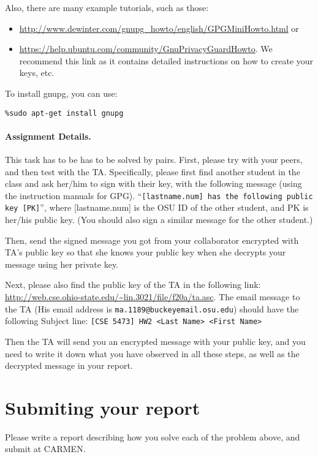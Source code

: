 \documentclass[11pt]{article}
\begin{document}
Also, there are many example tutorials, such as those:
\begin{itemize}
\item \url{http://www.dewinter.com/gnupg_howto/english/GPGMiniHowto.html} or
\item \url{https://help.ubuntu.com/community/GnuPrivacyGuardHowto}. We recommend this link as it contains detailed instructions on how to create your keys, etc.
\end{itemize}

To install gnupg, you can use:
\begin{lstlisting}
%sudo apt-get install gnupg
\end{lstlisting}

\paragraph{Assignment Details.} This task has to be has to be solved by pairs. First, please try with your peers, and then test with the TA. Specifically, please first find another student in the class and ask her/him to sign with their key, with the following message (using the instruction manuals for GPG). ``\texttt{[lastname.num] has the following public key [PK]}'',
where [lastname.num] is the OSU ID of the other student, and PK is her/his public key. (You should also sign a similar message for the other student.)

Then, send the signed message you got from your collaborator encrypted with TA's public key so that she knows your public key when she decrypts your message using her private key.

Next, please also find the public key of the TA in the following link: \url{http://web.cse.ohio-state.edu/~lin.3021/file/f20a/ta.asc}. The email message to the TA (His email address is \texttt{ma.1189@buckeyemail.osu.edu}) should have the following Subject line: \texttt{[CSE 5473] HW2 <Last Name> <First Name>}

Then the TA will send you an encrypted message with your public key, and you need to write it down what you have observed in all these steps, as well as the decrypted message in your report.


\vspace{1in}


\section{Submiting your report}
Please write a report describing how you solve each of the problem above, and submit at CARMEN.
\end{document}
